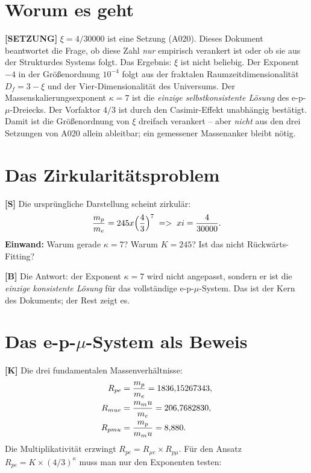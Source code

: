 \section{Worum es geht}

\textbf{[SETZUNG]} $\xi = 4/30000$ ist eine Setzung (A020). Dieses Dokument
beantwortet die Frage, ob diese Zahl \emph{nur} empirisch verankert ist oder ob
sie aus der Strukturdes Systems folgt. Das Ergebnis: $\xi$ ist nicht beliebig.
Der Exponent $-4$ in der Größenordnung $10^{-4}$ folgt aus der fraktalen
Raumzeitdimensionalität $D_f=3-\xi$ und der Vier-Dimensionalität des Universums.
Der Massenskalierungsexponent $\kappa=7$ ist die \emph{einzige selbstkonsistente
Lösung} des e-p-$\mu$-Dreiecks. Der Vorfaktor $4/3$ ist durch den Casimir-Effekt
unabhängig bestätigt. Damit ist die Größenordnung von $\xi$ dreifach verankert
-- aber \emph{nicht} aus den drei Setzungen von A020 allein ableitbar; ein
gemessener Massenanker bleibt nötig.

\section{Das Zirkularitätsproblem}

\textbf{[S]} Die ursprüngliche Darstellung scheint zirkulär:
\[
  \frac{m_p}{m_e} = 245\times\Bigl(\frac43\Bigr)^7
  \;\Rightarrow\; \xi = \frac{4}{30000}.
\]
\textbf{Einwand:} Warum gerade $\kappa=7$? Warum $K=245$? Ist das nicht
Rückwärts-Fitting?

\textbf{[B]} Die Antwort: der Exponent $\kappa=7$ wird nicht angepasst, sondern
er ist die \emph{einzige konsistente Lösung} für das vollständige e-p-$\mu$-System.
Das ist der Kern des Dokuments; der Rest zeigt es.

\section{Das e-p-$\mu$-System als Beweis}

\textbf{[K]} Die drei fundamentalen Massenverhältnisse:
\begin{align}
  R_{pe}    &= \frac{m_p}{m_e}   = 1836{,}15267343, \notag\\
  R_{\mu e} &= \frac{m_\mu}{m_e} = 206{,}7682830, \notag\\
  R_{p\mu}  &= \frac{m_p}{m_\mu} = 8{,}880. \notag
\end{align}
Die Multiplikativität erzwingt $R_{pe} = R_{\mu e}\times R_{p\mu}$. Für den
Ansatz $R_{pe} = K\times(4/3)^\kappa$ muss man nur den Exponenten testen:

